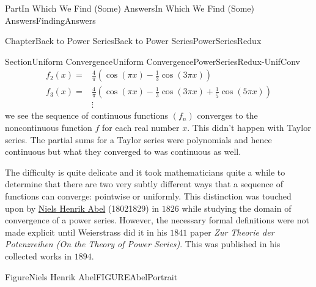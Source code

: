 \documentclass[oneside,10pt,]{book}
\newcommand{\pubtitle}[1]{\textsl{#1}}
\numberwithin{equation}{part}
\newcommand{\amp}{&}
\begin{document}
\begin{partptx}{Part}{In Which We Find (Some) Answers}{}{In Which We Find (Some) Answers}{}{}{FindingAnswers}
\begin{chapterptx}{Chapter}{Back to Power Series}{}{Back to Power Series}{}{}{PowerSeriesRedux}
\begin{sectionptx}{Section}{Uniform Convergence}{}{Uniform Convergence}{}{}{PowerSeriesRedux-UnifConv}
\begin{align*}
f_2(x)=\amp \frac{4}{\pi}\left(\cos \left(\pi x\right)-\frac{1}{3}\cos\left( 3\pi x\right)\right)\\
f_3(x)=\amp \frac{4}{\pi}\left(\cos\left(\pi x\right)-\frac{1}{3}\cos\left(3\pi x\right)+\frac{1}{5}\cos\left(5\pi x\right)\right)\\
\amp \vdots
\end{align*}
we see the sequence of continuous functions \(\left(f_n\right)\) converges to the non\textendash{}continuous function \(f\) for each real number \(x\).  This didn't happen with Taylor series.  The partial sums for a Taylor series were polynomials and hence continuous but what they converged to was continuous as well.%
\par
The difficulty is quite delicate and it took mathematicians quite a while to determine that there are two very subtly different ways that a sequence of functions can converge: pointwise or uniformly.  This distinction was touched upon by \href{https://mathshistory.st-andrews.ac.uk/Biographies/Abel/}{Niels Henrik Abel} (1802\textendash{}1829) in \(1826\) while studying the domain of convergence of a power series.  However, the necessary formal definitions were not made explicit until Weierstrass did it in his \(1841\) paper \pubtitle{Zur Theorie der Potenzreihen (On the Theory of Power Series)}. This was published in his collected works in \(1894\).%
\begin{figureptx}{Figure}{Niels Henrik Abel}{FIGUREAbelPortrait}{}%
%
%
\begin{image}{0.325}{0.35}{0.325}{}%

\end{image}
\end{figureptx}
\end{sectionptx}
\end{chapterptx}
\end{partptx}
\end{document}
